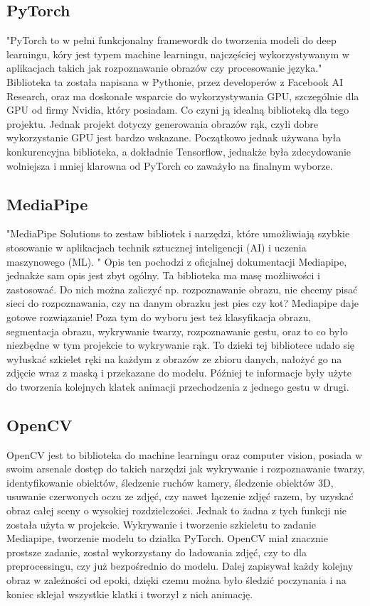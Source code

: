 \documentclass[12pt]{article}
\begin{document}
\begin{sloppypar}
{  \subsection{PyTorch}
  {
    "PyTorch to w pełni funkcjonalny framewordk do tworzenia modeli do deep learningu, kóry jest typem machine learningu, najczęściej wykorzystywanym w aplikacjach takich jak
    rozpoznawanie obrazów czy procesowanie języka."\cite{'pytorch-nvidia'} 
    Biblioteka ta została napisana w Pythonie, przez developerów z Facebook AI Research, oraz ma doskonałe wsparcie do wykorzystywania GPU, szczególnie dla GPU od firmy Nvidia, który posiadam.
    Co czyni ją idealną biblioteką dla tego projektu. Jednak projekt dotyczy generowania obrazów rąk, czyli dobre wykorzystanie GPU jest bardzo wskazane.
    Początkowo jednak używana była konkurencyjna biblioteka, a dokładnie Tensorflow, jednakże była zdecydowanie wolniejsza i mniej klarowna od PyTorch co zaważyło na finalnym wyborze.
  }
  \subsection{MediaPipe}
  {
    "MediaPipe Solutions to zestaw bibliotek i narzędzi, które umożliwiają szybkie stosowanie w aplikacjach technik sztucznej inteligencji (AI) i uczenia maszynowego (ML). "\cite{'mediapipe'}
    Opis ten pochodzi z oficjalnej dokumentacji Mediapipe, jednakże sam opis jest zbyt ogólny. 
    Ta biblioteka ma masę możliiwości i zastosować. Do nich można zaliczyć np. rozpoznawanie obrazu, nie chcemy pisać sieci do rozpoznawania, czy na danym obrazku jest pies czy kot? Mediapipe daje gotowe rozwiązanie!
    Poza tym do wyboru jest też klasyfikacja obrazu, segmentacja obrazu, wykrywanie twarzy, rozpoznawanie gestu, oraz to co było niezbędne w tym projekcie to wykrywanie rąk.
    To dzieki tej bibliotece udało się wyłuskać szkielet ręki na każdym z obrazów ze zbioru danych, nałożyć go na zdjęcie wraz z maską i przekazane do modelu. 
    Później te informacje były użyte do tworzenia kolejnych klatek animacji przechodzenia z jednego gestu w drugi.
  }
  \subsection{OpenCV}
  {
    OpenCV jest to biblioteka do machine learningu oraz computer vision, posiada w swoim arsenale dostęp do takich narzędzi jak wykrywanie i rozpoznawanie twarzy,
    identyfikowanie obiektów, śledzenie ruchów kamery, śledzenie obiektów 3D, usuwanie czerwonych oczu ze zdjęć, czy nawet łączenie zdjęć razem, by uzyskać obraz całej sceny o wysokiej rozdzielczości.\cite{'opencv'}
    Jednak to żadna z tych funkcji nie została użyta w projekcie. 
    Wykrywanie i tworzenie szkieletu to zadanie Mediapipe, tworzenie modelu to działka PyTorch. 
    OpenCV miał znacznie prostsze zadanie, został wykorzystany do ładowania zdjęć, czy to dla preprocessingu, czy już bezpośrednio do modelu.
    Dalej zapisywał każdy kolejny obraz w zależności od epoki, dzięki czemu można było śledzić poczynania i na koniec sklejał wszystkie klatki i tworzył z nich animację.
  }
}


\end{sloppypar}
\end{document}
